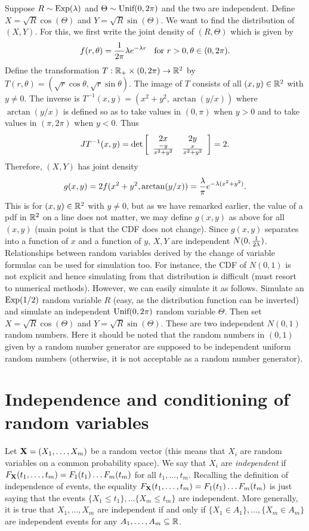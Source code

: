 \documentclass[preprint,  11pt]{amsart}
\def\X{{\bf X}}
\newcommand{\matrices}[4]{\l[\begin{array}{cc} #1 & #2 \\ #3 & #4  \end{array} \r]}
\begin{document}
\beg Suppose $R\sim \mb{Exp}(\lam)$ and $\Theta\sim \mb{Unif}(0,2\pi)$ and the two are independent. Define $X=\sqrt{R}\cos(\Theta)$ and $Y=\sqrt{R}\sin(\Theta)$. We want to find the distribution of $(X,Y)$. For this, we first write the joint density of $(R,\Theta)$ which is given by
$$
f(r,\theta)=\frac{1}{2\pi}\lam e^{-\lam r} \hsp{2mm}\mb{ for }r>0,\theta\in (0,2\pi).
$$
Define the transformation $T:\R_{+}\times (0,2\pi)\to \R^{2}$ by $T(r,\theta)=(\sqrt{r}\cos\theta,\sqrt{r}\sin \theta)$. The image of $T$ consists of all $(x,y)\in \R^{2}$ with $y\not=0$. The inverse is $T^{-1}(x,y)=(x^{2}+y^{2},\arctan(y/x))$ where $\arctan(y/x)$ is defined so as to take values in $(0,\pi)$ when $y>0$ and to take values in $(\pi,2\pi)$ when $y<0$. Thus
$$
JT^{-1}(x,y) = \det\matrices{2x}{2y}{\frac{-y}{x^{2}+y^{2}}}{\frac{x}{x^{2}+y^{2}}}=2.
$$
Therefore, $(X,Y)$ has joint density
$$
g(x,y) = 2f(x^{2}+y^{2},\arctan(y/x)) = \frac{\lam}{\pi} e^{-\lam(x^{2}+y^{2})}.
$$
This is for $(x,y)\in \R^{2}$ with $y\not=0$, but as we have remarked earlier, the value of a pdf in $\R^{2}$ on a line does not matter, we may define $g(x,y)$ as above for all $(x,y)$ (main point is that the CDF does not change). Since $g(x,y)$ separates into a function of $x$ and a function of $y$, $X,Y$ are independent $N(0,\frac{1}{2\lam})$.
\eeg
\berk Relationships between random variables derived by the change of variable formulas can be used for simulation too. For instance, the CDF of $N(0,1)$ is not explicit and hence simulating from that distribution is difficult (must resort to numerical methods). However, we can easily simulate it as follows. Simulate an $\mb{Exp}(1/2)$ random variable $R$ (easy, as the distribution function can be inverted) and simulate an independent $\mb{Unif}(0,2\pi)$ random variable $\Theta$. Then set $X=\sqrt{R}\cos(\Theta)$ and $Y=\sqrt{R}\sin(\Theta)$. These are two independent $N(0,1)$ random numbers. Here it should be noted that the random numbers in $(0,1)$ given by a random number generator are supposed to be independent uniform random numbers (otherwise, it is not acceptable as a random number generator).
\eerk


\section{Independence and conditioning of random variables}
\bdefn Let $\X=(X_{1},\ldots ,X_{m})$ be a random vector (this means that $X_{i}$ are random variables on a common probability space). We say that $X_{i}$ are {\em independent} if $F_{\X}(t_{1},\ldots ,t_{m})=F_{1}(t_{1})\ldots F_{m}(t_{m})$ for all $t_{1},\ldots ,t_{m}$.
\edefn
\berk Recalling the definition of independence of events, the equality $F_{\X}(t_{1},\ldots ,t_{m})=F_{1}(t_{1})\ldots F_{m}(t_{m})$ is just saying that the events $\{X_{1}\le t_{1}\}, \ldots \{X_{m}\le t_{m}\}$ are independent. More generally, it is true that $X_{1},\ldots ,X_{m}$ are independent if and only if $\{X_{1}\in A_{1}\},\ldots ,\{X_{m}\in A_{m}\}$ are independent events for any $A_{1},\ldots, A_{m}\subseteq \R$.
\eerk
\end{document}
